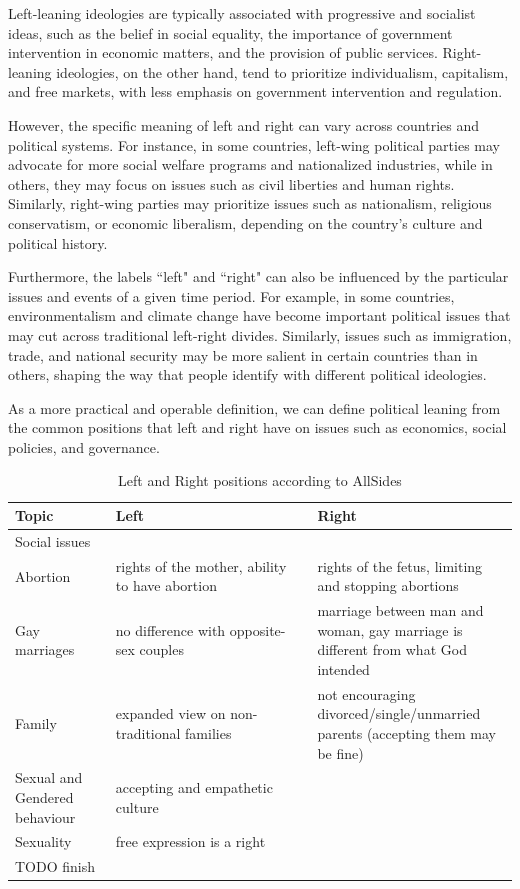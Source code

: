 Left-leaning ideologies are typically associated with progressive and socialist ideas, such as the belief in social equality, the importance of government intervention in economic matters, and the provision of public services.
Right-leaning ideologies, on the other hand, tend to prioritize individualism, capitalism, and free markets, with less emphasis on government intervention and regulation.

However, the specific meaning of left and right can vary across countries and political systems.
For instance, in some countries, left-wing political parties may advocate for more social welfare programs and nationalized industries, while in others, they may focus on issues such as civil liberties and human rights.
Similarly, right-wing parties may prioritize issues such as nationalism, religious conservatism, or economic liberalism, depending on the country's culture and political history.

Furthermore, the labels ``left" and ``right" can also be influenced by the particular issues and events of a given time period.
For example, in some countries, environmentalism and climate change have become important political issues that may cut across traditional left-right divides.
Similarly, issues such as immigration, trade, and national security may be more salient in certain countries than in others, shaping the way that people identify with different political ideologies.




As a more practical and operable definition, we can define political leaning from the common positions that left and right have on issues such as economics, social policies, and governance.


\begin{table}[ht]
    \centering
    \begin{tabular}{p{0.2\linewidth} | p{0.4\linewidth} | p{0.4\linewidth}}
      Topic  & Left & Right \\ \hline
      Social issues & \\
      Abortion & rights of the mother, ability to have abortion & rights of the fetus, limiting and stopping abortions \\
      Gay marriages & no difference with opposite-sex couples & marriage between man and woman, gay marriage is different from what God intended \\
      Family & expanded view on non-traditional families & not encouraging divorced/single/unmarried parents (accepting them may be fine) \\
      Sexual and Gendered behaviour & accepting and empathetic culture & \\
      Sexuality & free expression is a right & \\
      TODO finish
    \end{tabular}
    \caption{Left and Right positions according to AllSides}
    \label{tab:allsides_leaning_positions}
\end{table}

